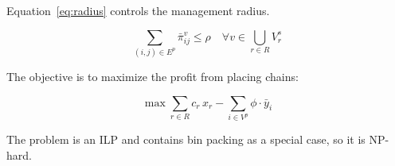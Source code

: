 Equation~\eqref{eq:radius} controls the management radius.

\begin{equation}\label{eq:radius}
\sum_{(i,j) \in E^p} \bar{\pi}^v_{ij} \le \rho
\quad \forall v \in \bigcup_{r \in R} V^s_r
\end{equation}

The objective is to maximize the profit from placing chains:

\begin{equation}\label{eq:objective}
\max \sum_{r \in R} c_r\, x_r - \sum_{i \in V^p} \phi \cdot \bar{y}_i
\end{equation}

The problem is an ILP and contains bin packing as a special case, so it is
NP-hard.
